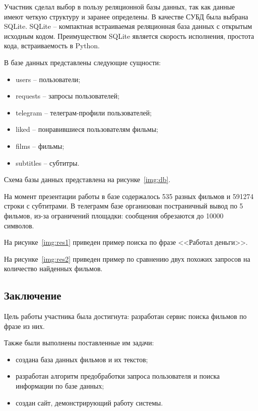 Участник сделал выбор
в пользу реляционной базы данных, так как данные имеют четкую структуру и заранее определены. В качестве СУБД была выбрана SQLite. SQLite -- компактная встраиваемая реляционная база данных с открытым исходным кодом. Преимуществом SQLite является скорость исполнения, простота кода, встраиваемость в Python.

В базе данных представлены следующие сущности:
\begin{itemize}
	\item users -- пользователи;
	\item requests -- запросы пользователей;
	\item telegram -- телеграм-профили пользователей;
	\item liked -- понравившиеся пользователям фильмы;
	\item films -- фильмы;
	\item subtitles -- субтитры.
\end{itemize}

Схема базы данных представлена на рисунке~\ref{img:db}.

На момент презентации работы в базе содержалось 535 разных фильмов и 591274
строки с субтитрами. В телеграмм базе организован постраничный вывод
по 5 фильмов, из-за ограничений площадки: сообщения обрезаются до 10000
символов.

На рисунке~\ref{img:res1} приведен пример поиска по фразе <<Работал деньги>>. 

На рисунке~\ref{img:res2} приведен пример по сравнению двух похожих запросов на количество найденных фильмов. 

\subsection{Заключение}

Цель работы участника была достигнута: разработан сервис поиска фильмов по фразе из них.

Также были выполнены поставленные им задачи:
\begin{itemize}
	\item создана база данных фильмов и их текстов;
	\item разработан алгоритм предобработки запроса пользователя и поиска информации по базе данных;
	\item создан сайт, демонстрирующий работу системы.
\end{itemize}

